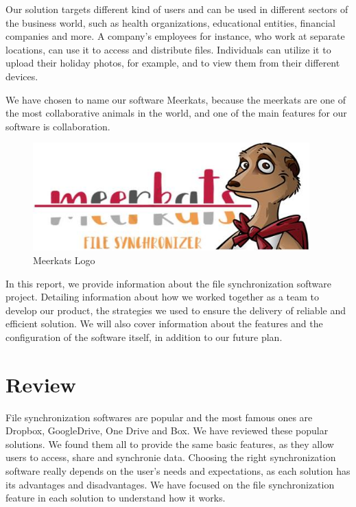 \documentclass{article}
\begin{document}
Our solution targets different kind of users and can be used in different sectors of the business world, such as health organizations, educational entities, financial companies and more. A company's employees for instance, who work at separate locations, can use it to access and distribute files. Individuals can utilize it to upload their holiday photos, for example, and to view them from their different devices.

We have chosen to name our software Meerkats, because the meerkats are one of the most collaborative animals in the world, and one of the main features for our software is collaboration.

\begin{figure}[h]
    \centering
    \includegraphics[width=0.95\textwidth]{logo}
    \caption{Meerkats Logo}
    \label{fig:logo1}
\end{figure}

In this report, we provide information about the file synchronization software project. Detailing information about how we worked together as a team to develop our product, the strategies we used to ensure the delivery of reliable and efficient solution. We will also cover information about the features and the configuration of the software itself, in addition to our future plan.


\section{Review}
File synchronization softwares are popular and the most famous ones are Dropbox, GoogleDrive, One Drive and Box. We have reviewed these popular solutions. We found them all to provide the same basic features, as they allow users to access, share and synchronie data. Choosing the right synchronization software really depends on the user's needs and expectations, as each solution has its advantages and disadvantages. We have focused on the file synchronization feature in each solution to understand how it works.
\end{document}
